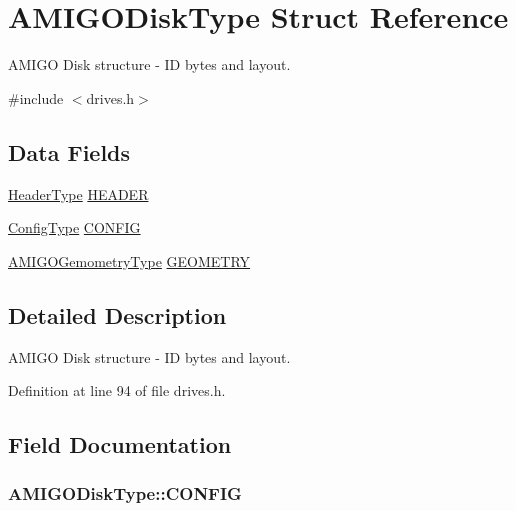 \hypertarget{structAMIGODiskType}{}\section{A\+M\+I\+G\+O\+Disk\+Type Struct Reference}
\label{structAMIGODiskType}


A\+M\+I\+GO Disk structure -\/ ID bytes and layout.  




{\ttfamily \#include $<$drives.\+h$>$}

\subsection*{Data Fields}
\begin{DoxyCompactItemize}
\item 
\hyperlink{structHeaderType}{Header\+Type} \hyperlink{structAMIGODiskType_a9814efe6f564b104fc7e0100231908a8}{H\+E\+A\+D\+ER}
\item 
\hyperlink{structConfigType}{Config\+Type} \hyperlink{structAMIGODiskType_aae94c3403ceb917006591e7bd4109207}{C\+O\+N\+F\+IG}
\item 
\hyperlink{structAMIGOGemometryType}{A\+M\+I\+G\+O\+Gemometry\+Type} \hyperlink{structAMIGODiskType_aa75cfbfabf8081ff7bca08cf87af4da8}{G\+E\+O\+M\+E\+T\+RY}
\end{DoxyCompactItemize}


\subsection{Detailed Description}
A\+M\+I\+GO Disk structure -\/ ID bytes and layout. 

Definition at line 94 of file drives.\+h.



\subsection{Field Documentation}
\subsubsection[{\texorpdfstring{C\+O\+N\+F\+IG}{CONFIG}}]{ A\+M\+I\+G\+O\+Disk\+Type\+::\+C\+O\+N\+F\+IG}\hypertarget{structAMIGODiskType_aae94c3403ceb917006591e7bd4109207}{}\label{structAMIGODiskType_aae94c3403ceb917006591e7bd4109207}


